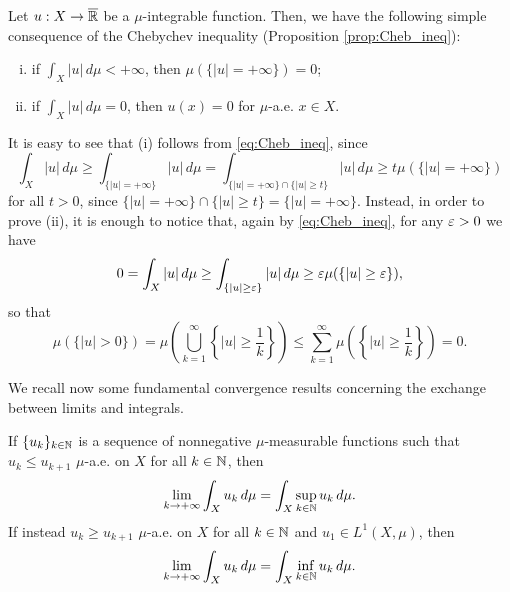 \begin{remark} \label{rem_easy_Cheb} Let $u : X \to \overline{\mathbb{R}}$ be a $\mu$-integrable function. Then, we have the following simple consequence of the Chebychev inequality (Proposition \ref{prop:Cheb_ineq}):
\begin{enumerate}[i)]
\item if $\int_{X} |u| \, d \mu < + \infty$, then $\mu(\{ |u| = + \infty\}) = 0$;
\item if $\int_{X} |u| \, d \mu = 0$, then $u(x) = 0$ for $\mu$-a.e. $x \in X$. 
\end{enumerate}
It is easy to see that (i) follows from \eqref{eq:Cheb_ineq}, since
\begin{equation*}
\int_{X} |u| \, d \mu \ge \int_{\{|u| = + \infty\}} |u| \, d \mu = \int_{\{|u| = + \infty\} \cap \{|u| \ge t\}} |u| \, d \mu \ge t \mu(\{ |u| = + \infty\}) 
\end{equation*}
for all $t > 0$, since $\{|u| = + \infty\} \cap \{|u| \ge t\} = \{|u| = + \infty\}$.
Instead, in order to prove (ii), it is enough to notice that, again by \eqref{eq:Cheb_ineq}, for any $\varepsilon > 0$ we have
\begin{equation*}
0 = \int_{X} |u| \, d \mu \ge \int_{\{|u| \ge \varepsilon\}}|u| \, d \mu \ge \varepsilon \mu(\{ |u| \ge \varepsilon \}),
\end{equation*} 
so that 
\begin{equation*}
\mu\left(\{ |u| > 0\}\right) = \mu \left ( \bigcup_{k = 1}^{\infty} \left \{ |u| \ge \frac{1}{k} \right \} \right ) \le \sum_{k = 1}^{\infty} \mu \left ( \left \{ |u| \ge \frac{1}{k} \right \} \right ) = 0.
\end{equation*}
\end{remark}

We recall now some fundamental convergence results concerning the exchange between limits and integrals.

\begin{theorem} \label{thm:monotone_thm}
If $\{u_{k}\}_{k \in \mathbb{N}}$ is a sequence of nonnegative $\mu$-measurable functions such that $u_{k} \le u_{k + 1}$ $\mu$-a.e. on $X$ for all $k \in \mathbb{N}$, then
\begin{equation*}
\lim_{k \to + \infty} \int_{X} u_{k} \, d \mu = \int_{X} \sup_{k \in \mathbb{N}} u_{k} \, d\mu.
\end{equation*}
If instead $u_{k} \ge u_{k + 1}$ $\mu$-a.e. on $X$ for all $k \in \mathbb{N}$ and $u_{1} \in L^{1}(X, \mu)$, then
\begin{equation*}
\lim_{k \to + \infty} \int_{X} u_{k} \, d \mu = \int_{X} \inf_{k \in \mathbb{N}} u_{k} \, d\mu.
\end{equation*}
\end{theorem}

